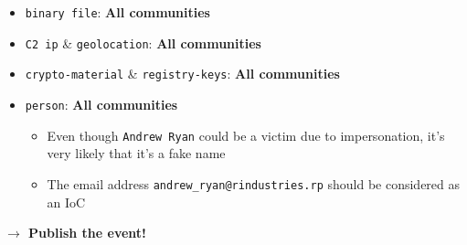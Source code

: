 \begin{frame}
    \begin{itemize}
        \item \texttt{binary file}: \textbf{All communities}
        \item \texttt{C2 ip} \& \texttt{geolocation}: \textbf{All communities}
        \item \texttt{crypto-material} \& \texttt{registry-keys}: \textbf{All communities}
        \item \texttt{person}: \textbf{All communities}
        \begin{itemize}
            \item Even though \texttt{Andrew Ryan} could be a victim due to impersonation, it's very likely that it's a fake name
            \item The email address \texttt{andrew\_ryan@rindustries.rp} should be considered as an IoC
        \end{itemize}
    \end{itemize}
    \begin{center}
        \textbf{$\rightarrow$ Publish the event!}
    \end{center}
\end{frame}
